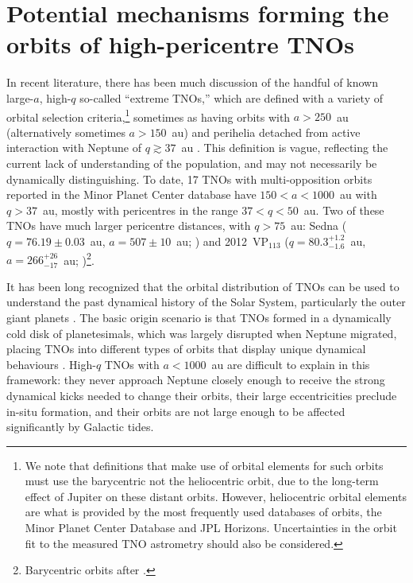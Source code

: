 \documentclass[preprint]{aastex62}
\begin{document}
\section{Potential mechanisms forming the orbits of high-pericentre TNOs} \label{sec:highq}

In recent literature, there has been much discussion of the handful of known large-$a$, high-$q$ so-called ``extreme TNOs,'' which are defined with a variety of orbital selection criteria,\footnote{We note that definitions that make use of orbital elements for such orbits must use the barycentric not the heliocentric orbit, due to the long-term effect of Jupiter on these distant orbits.
However, heliocentric orbital elements are what is provided by the most frequently used databases of orbits, the Minor Planet Center Database and JPL Horizons. Uncertainties in the orbit fit to the measured TNO astrometry should also be considered.}  sometimes as having orbits with $a>250$~au (alternatively sometimes $a>150$~au) and perihelia detached from active interaction with Neptune of $q\gtrsim37$~au \citep[e.g.][]{Kiss13,Sheppardetal2016,dlfmdlfm16c,shankman17bias,bannister17,becker18}.
This definition is vague, reflecting the current lack of understanding of the population, and may not necessarily be dynamically distinguishing. %
To date, 17 TNOs with multi-opposition orbits reported in the Minor Planet Center database have $150<a<1000$~au with $q>37$~au, mostly with pericentres in the range $37<q<50$~au.
Two of these TNOs have much larger pericentre distances, with $q>75$~au: Sedna ($q=76.19 \pm 0.03$~au, $a=507 \pm 10$~au; \citealt{brownetal04}) and 2012~VP$_{113}$ ($q=80.3^{+1.2}_{-1.6}$~au, $a = 266^{+26}_{-17}$~au; \citealt{trujillosheppard14})\footnote{Barycentric orbits after \citet{bannister17}.}. 

It has been long recognized that the orbital distribution of TNOs can be used to understand the past dynamical history of the Solar System, particularly the outer giant planets \citep{malhotra93,levison08}.
The basic origin scenario is that TNOs formed in a dynamically cold disk of planetesimals, which was largely disrupted when Neptune migrated, placing TNOs into different types of orbits that display unique dynamical behaviours \citep[see][]{gladman08}.  
High-$q$ TNOs with $a<1000$~au are difficult to explain in this framework: they never approach Neptune closely enough to receive the strong dynamical kicks needed to change their orbits, their large eccentricities preclude in-situ formation, and their orbits are not large enough to be affected significantly by Galactic tides.  
\end{document}
